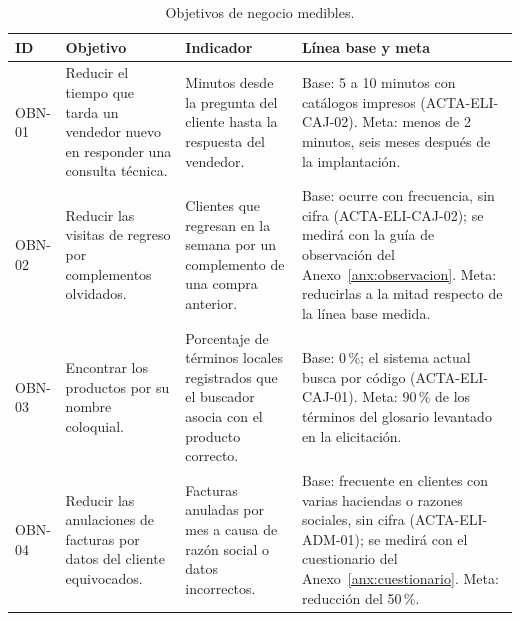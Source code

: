 \begin{table}[H]
\centering
\caption{Objetivos de negocio medibles.}
\label{tab:objetivos}
\small
\begin{tabularx}{\textwidth}{@{}L{1.1cm}L{3.6cm}L{3.4cm}X@{}}
\toprule
\textbf{ID} & \textbf{Objetivo} & \textbf{Indicador} & \textbf{Línea base y meta} \\
\midrule
OBN-01 & Reducir el tiempo que tarda un vendedor nuevo en responder una consulta técnica. & Minutos desde la pregunta del cliente hasta la respuesta del vendedor. & Base: 5 a 10 minutos con catálogos impresos (ACTA-ELI-CAJ-02). Meta: menos de 2 minutos, seis meses después de la implantación. \\
OBN-02 & Reducir las visitas de regreso por complementos olvidados. & Clientes que regresan en la semana por un complemento de una compra anterior. & Base: ocurre con frecuencia, sin cifra (ACTA-ELI-CAJ-02); se medirá con la guía de observación del Anexo~\ref{anx:observacion}. Meta: reducirlas a la mitad respecto de la línea base medida. \\
OBN-03 & Encontrar los productos por su nombre coloquial. & Porcentaje de términos locales registrados que el buscador asocia con el producto correcto. & Base: 0\,\%; el sistema actual busca por código (ACTA-ELI-CAJ-01). Meta: 90\,\% de los términos del glosario levantado en la elicitación. \\
OBN-04 & Reducir las anulaciones de facturas por datos del cliente equivocados. & Facturas anuladas por mes a causa de razón social o datos incorrectos. & Base: frecuente en clientes con varias haciendas o razones sociales, sin cifra (ACTA-ELI-ADM-01); se medirá con el cuestionario del Anexo~\ref{anx:cuestionario}. Meta: reducción del 50\,\%. \\
\bottomrule
\end{tabularx}
\end{table}
